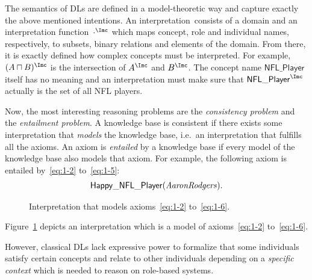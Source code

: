 The semantics of DLs are defined in a model-theoretic way and capture exactly the above mentioned
intentions.  An interpretation~\I consists of a domain and an interpretation function~$\cdot^{\I}$
which maps concept, role and individual names, respectively, to subsets, binary relations and elements of the
domain.  From there, it is exactly defined how complex concepts must be
interpreted. For example, $(A\sqcap B)^{\I}$ is the intersection of $A^{\I}$ and $B^{\I}$.  The
concept name $\mathsf{NFL\_Player}$ itself has no meaning and an interpretation must make sure that
$\mathsf{NFL\_Player}^{\I}$ actually is the set of all NFL players.

Now, the most interesting reasoning problems are the \emph{consistency problem} and the \emph{entailment
problem}. A knowledge base is consistent if there exists some interpretation that \emph{models} the
knowledge base, i.e.\ an interpretation that fulfills all the axioms. An axiom is \emph{entailed} by
a knowledge base if every model of the knowledge base also models that axiom. For example, the following axiom is
entailed by~\eqref{eq:1-2} to~\eqref{eq:1-5}:
\begin{gather}
  \mathsf{Happy\_NFL\_Player}(\text{\textit{AaronRodgers}}).\label{eq:1-6}
\end{gather}


\begin{figure}
  \centering
  \caption{Interpretation that models axioms~\eqref{eq:1-2} to~\eqref{eq:1-6}.}
  \label{fig:dl-example-intro}
\end{figure}

\noindent
Figure~\ref{fig:dl-example-intro} depicts an interpretation which is a model of axioms~\eqref{eq:1-2} to~\eqref{eq:1-6}.

However, classical DLs lack expressive power to formalize that some individuals satisfy certain
concepts and relate to other individuals depending on a \emph{specific context} which is needed to
reason on role-based systems.

